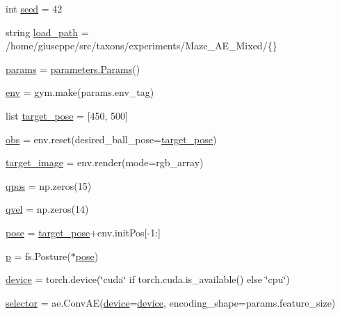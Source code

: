 \begin{DoxyCompactItemize}
\item 
int \hyperlink{namespacetest__control_ae158d671cba39de4c75b859124aeefb3}{seed} = 42
\item 
string \hyperlink{namespacetest__control_ae0ffacf2431cf5da41b09805a26a445f}{load\+\_\+path} = \textquotesingle{}/home/giuseppe/src/taxons/experiments/Maze\+\_\+\+A\+E\+\_\+\+Mixed/\{\}\textquotesingle{}
\item 
\hyperlink{namespacetest__control_aec18b6291ee0bb2177b997d322d8ffe3}{params} = \hyperlink{classparameters_1_1_params}{parameters.\+Params}()
\item 
\hyperlink{namespacetest__control_a0267ecd99d77e4bcb609bd63f4bed1bb}{env} = gym.\+make(params.\+env\+\_\+tag)
\item 
list \hyperlink{namespacetest__control_acab1d8f94fdfa116b9180b0d82693741}{target\+\_\+pose} = \mbox{[}450, 500\mbox{]}
\item 
\hyperlink{namespacetest__control_a97883b305a39e99ddbe21071b7351b46}{obs} = env.\+reset(desired\+\_\+ball\+\_\+pose=\hyperlink{namespacetest__control_acab1d8f94fdfa116b9180b0d82693741}{target\+\_\+pose})
\item 
\hyperlink{namespacetest__control_aebc61fa5fbcc4639b31cb9c4b9e33a17}{target\+\_\+image} = env.\+render(mode=\textquotesingle{}rgb\+\_\+array\textquotesingle{})
\item 
\hyperlink{namespacetest__control_af4139c43eec64fc6687c74defc4c4fed}{qpos} = np.\+zeros(15)
\item 
\hyperlink{namespacetest__control_acef30ea01ea2a970e96ecf849bedcfc7}{qvel} = np.\+zeros(14)
\item 
\hyperlink{namespacetest__control_ae91bf3253d8443e730376135c1d71210}{pose} = \hyperlink{namespacetest__control_acab1d8f94fdfa116b9180b0d82693741}{target\+\_\+pose}+env.\+init\+Pos\mbox{[}-\/1\+:\mbox{]}
\item 
\hyperlink{namespacetest__control_ad1be37697cee4f1a376671df94d424bb}{p} = fs.\+Posture($\ast$\hyperlink{namespacetest__control_ae91bf3253d8443e730376135c1d71210}{pose})
\item 
\hyperlink{namespacetest__control_a7585b10e37df81a5eb7b6df2329a1afd}{device} = torch.\+device(\char`\"{}cuda\char`\"{} if torch.\+cuda.\+is\+\_\+available() else \char`\"{}cpu\char`\"{})
\item 
\hyperlink{namespacetest__control_ad93174840888f121d55f7d07f6ac1d4a}{selector} = ae.\+Conv\+AE(\hyperlink{namespacetest__control_a7585b10e37df81a5eb7b6df2329a1afd}{device}=\hyperlink{namespacetest__control_a7585b10e37df81a5eb7b6df2329a1afd}{device}, encoding\+\_\+shape=params.\+feature\+\_\+size)

\end{DoxyCompactItemize}
